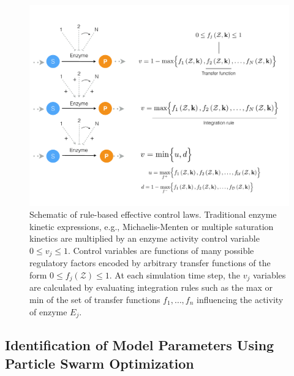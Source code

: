 \documentclass[processes,article,received,moreauthors,pdftex,12pt,a4paper]{mdpi}
\begin{document}
\begin{figure}[H]
\centering
\includegraphics[width=1.0\textwidth]{./figs/Figure-2-ControlSchematic.pdf}
\caption{Schematic of rule-based effective control laws. 
Traditional enzyme kinetic expressions, e.g., Michaelis-Menten or multiple saturation kinetics are multiplied by an enzyme activity control variable $0 \leq v_{j} \leq 1 $. 
Control variables are functions of many possible regulatory factors encoded by arbitrary transfer functions of the form $0\leq f_{j}\left(\mathcal{Z}\right)\leq 1$.
At each simulation time step, the $v_{j}$ variables are calculated by evaluating integration rules such as the max or min of the set of transfer functions $f_{1},\hdots,f_{n}$ 
influencing the activity of enzyme $E_{j}$. }\label{fig-control-schematic}
\end{figure}

\subsection{Identification of Model Parameters Using Particle Swarm Optimization}
\end{document}
